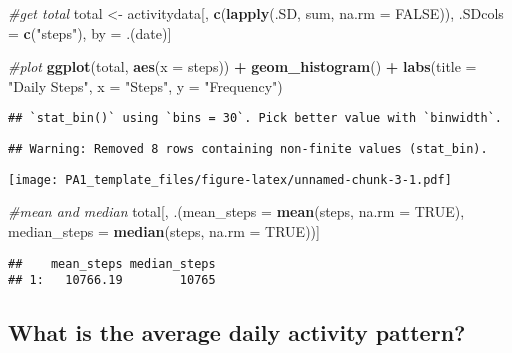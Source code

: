 \documentclass[
]{article}
\newenvironment{Shaded}{\begin{snugshade}}{\end{snugshade}}
\newcommand{\CommentTok}[1]{\textcolor[rgb]{0.56,0.35,0.01}{\textit{#1}}}
\newcommand{\DataTypeTok}[1]{\textcolor[rgb]{0.13,0.29,0.53}{#1}}
\newcommand{\KeywordTok}[1]{\textcolor[rgb]{0.13,0.29,0.53}{\textbf{#1}}}
\newcommand{\NormalTok}[1]{#1}
\newcommand{\OperatorTok}[1]{\textcolor[rgb]{0.81,0.36,0.00}{\textbf{#1}}}
\newcommand{\OtherTok}[1]{\textcolor[rgb]{0.56,0.35,0.01}{#1}}
\newcommand{\StringTok}[1]{\textcolor[rgb]{0.31,0.60,0.02}{#1}}
\begin{document}
\begin{Shaded}
\begin{Highlighting}[]
\CommentTok{#get total}
\NormalTok{total <-}\StringTok{ }\NormalTok{activitydata[, }\KeywordTok{c}\NormalTok{(}\KeywordTok{lapply}\NormalTok{(.SD, sum, }\DataTypeTok{na.rm =} \OtherTok{FALSE}\NormalTok{)), .SDcols =}\StringTok{ }\KeywordTok{c}\NormalTok{(}\StringTok{"steps"}\NormalTok{), by =}\StringTok{ }\NormalTok{.(date)]}

\CommentTok{#plot}
\KeywordTok{ggplot}\NormalTok{(total, }\KeywordTok{aes}\NormalTok{(}\DataTypeTok{x =}\NormalTok{ steps)) }\OperatorTok{+}
\StringTok{        }\KeywordTok{geom_histogram}\NormalTok{() }\OperatorTok{+}
\StringTok{        }\KeywordTok{labs}\NormalTok{(}\DataTypeTok{title =} \StringTok{"Daily Steps"}\NormalTok{, }\DataTypeTok{x =} \StringTok{"Steps"}\NormalTok{, }\DataTypeTok{y =} \StringTok{"Frequency"}\NormalTok{)}
\end{Highlighting}
\end{Shaded}

\begin{verbatim}
## `stat_bin()` using `bins = 30`. Pick better value with `binwidth`.
\end{verbatim}

\begin{verbatim}
## Warning: Removed 8 rows containing non-finite values (stat_bin).
\end{verbatim}

\texttt{[image: PA1\_template\_files/figure-latex/unnamed-chunk-3-1.pdf]}

\begin{Shaded}
\begin{Highlighting}[]
\CommentTok{#mean and median}
\NormalTok{total[, .(}\DataTypeTok{mean_steps =} \KeywordTok{mean}\NormalTok{(steps, }\DataTypeTok{na.rm =} \OtherTok{TRUE}\NormalTok{), }\DataTypeTok{median_steps =} \KeywordTok{median}\NormalTok{(steps, }\DataTypeTok{na.rm =} \OtherTok{TRUE}\NormalTok{))]}
\end{Highlighting}
\end{Shaded}

\begin{verbatim}
##    mean_steps median_steps
## 1:   10766.19        10765
\end{verbatim}

\hypertarget{what-is-the-average-daily-activity-pattern}{%
\subsection{What is the average daily activity
pattern?}\label{what-is-the-average-daily-activity-pattern}}
\end{document}
